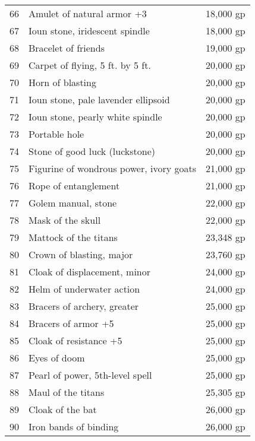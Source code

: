 \begin{table}[]
\begin{tabular}{lll}
66  & Amulet of natural armor +3                  & 18,000 gp    \\
67  & Ioun stone, iridescent spindle              & 18,000 gp    \\
68  & Bracelet of friends                         & 19,000 gp    \\
69  & Carpet of flying, 5 ft. by 5 ft.            & 20,000 gp    \\
70  & Horn of blasting                            & 20,000 gp    \\
71  & Ioun stone, pale lavender ellipsoid         & 20,000 gp    \\
72  & Ioun stone, pearly white spindle            & 20,000 gp    \\
73  & Portable hole                               & 20,000 gp    \\
74  & Stone of good luck (luckstone)              & 20,000 gp    \\
75  & Figurine of wondrous power, ivory goats     & 21,000 gp    \\
76  & Rope of entanglement                        & 21,000 gp    \\
77  & Golem manual, stone                         & 22,000 gp    \\
78  & Mask of the skull                           & 22,000 gp    \\
79  & Mattock of the titans                       & 23,348 gp    \\
80  & Crown of blasting, major                    & 23,760 gp    \\
81  & Cloak of displacement, minor                & 24,000 gp    \\
82  & Helm of underwater action                   & 24,000 gp    \\
83  & Bracers of archery, greater                 & 25,000 gp    \\
84  & Bracers of armor +5                         & 25,000 gp    \\
85  & Cloak of resistance +5                      & 25,000 gp    \\
86  & Eyes of doom                                & 25,000 gp    \\
87  & Pearl of power, 5th-level spell             & 25,000 gp    \\
88  & Maul of the titans                          & 25,305 gp    \\
89  & Cloak of the bat                            & 26,000 gp    \\
90  & Iron bands of binding                       & 26,000 gp    \\

\end{tabular}
\end{table}
